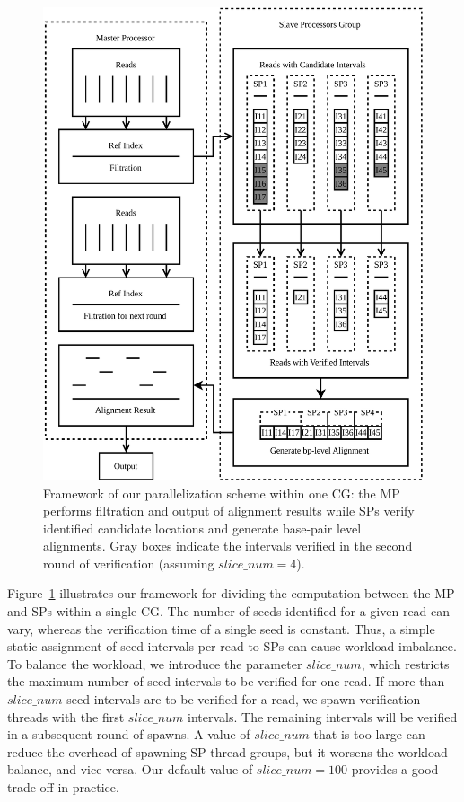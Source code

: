 \begin{figure}[!htb]
  \includegraphics[width=\linewidth]{figures/SPParallel}
  \caption{Framework of our parallelization scheme within one CG: the
    MP performs filtration and output of alignment results while SPs
    verify identified candidate locations and generate base-pair level
    alignments. Gray boxes indicate the intervals verified in the
    second round of verification (assuming $slice\_num = 4$).}
  \label{SPParallel}
\end{figure}

Figure~\ref{SPParallel} illustrates our framework for dividing the
computation between the MP and SPs within a single CG. The number of
seeds identified for a given read can vary, whereas the verification time
of a single seed is constant. Thus, a simple static assignment of seed
intervals per read to SPs can cause workload imbalance.  To balance
the workload, we introduce the parameter $slice\_num$, which restricts
the maximum number of seed intervals to be verified for one read. If
more than $slice\_num$ seed intervals are to be verified for a
read, we spawn verification threads with the first $slice\_num$
intervals. The remaining intervals will be verified in a subsequent
round of spawns. A value of $slice\_num$ that is too large can reduce
the overhead of spawning SP thread groups, but it worsens the workload
balance, and vice versa. Our default value of $slice\_num = 100$
provides a good trade-off in practice.



